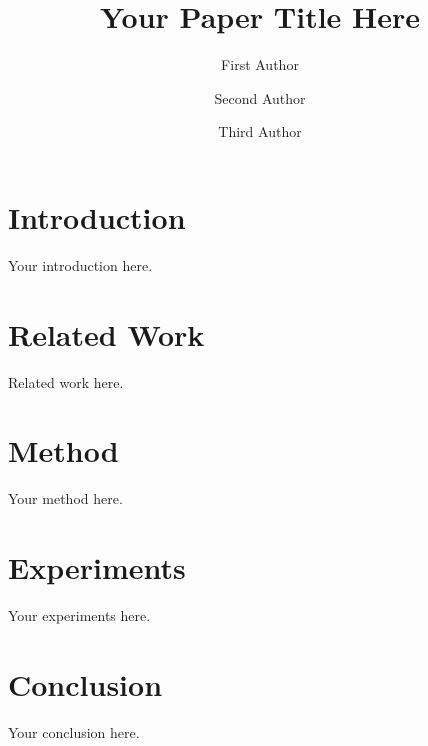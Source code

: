 \documentclass[11pt,letterpaper]{iffyuan}
\title{Your Paper Title Here}
\author[1]{First Author}
\author[1,\textdagger]{Second Author}
\author[2]{Third Author}
\affiliation[1]{First Affiliation}
\affiliation[2]{Second Affiliation}
\begin{document}
\maketitle

\section{Introduction}

Your introduction here.

\section{Related Work}

Related work here.

\section{Method}

Your method here.

\section{Experiments}

Your experiments here.

\section{Conclusion}

Your conclusion here.



\end{document}
